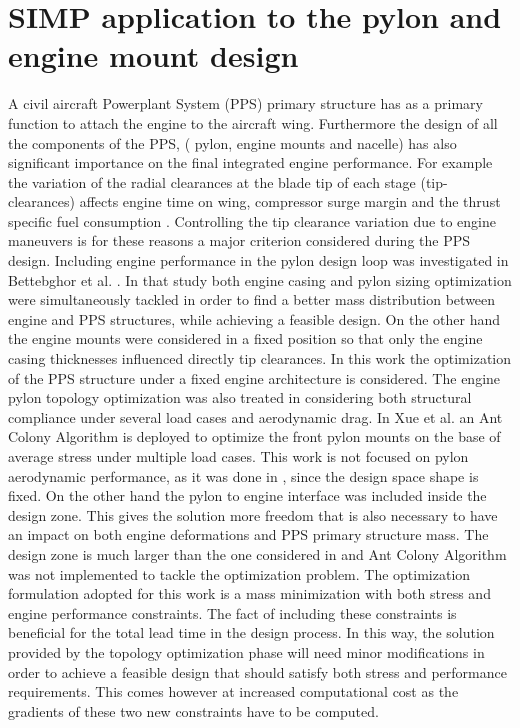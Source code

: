 \section{SIMP application to the pylon and engine mount design}
\label{SIMP_application}
A civil aircraft Powerplant System (PPS) primary structure has as a primary function to attach the engine to the aircraft wing. Furthermore the design of all the components of the PPS, ( pylon, engine mounts and nacelle) has also significant importance on the final integrated engine performance.
For example the variation of the radial clearances at the blade tip of each stage (tip-clearances) affects engine time on wing, compressor surge margin and the thrust specific fuel consumption \cite{lattime2002turbine,benito20083d}. Controlling the tip clearance variation due to engine maneuvers is for these reasons a major criterion considered during the PPS design. Including engine performance in the pylon design loop was investigated in Bettebghor et al. \cite{bettebghor2013bi}. In that study both engine casing and pylon sizing optimization were simultaneously tackled in order to find a better mass distribution between engine and PPS structures, while achieving a feasible design. On the other hand the engine mounts were considered in a fixed position so that only the engine casing thicknesses influenced directly tip clearances.
In this work the optimization of the PPS structure under a fixed engine architecture is considered.
 The engine pylon topology optimization was also treated in \cite{remouchamps2011application} considering both structural compliance under several load cases and aerodynamic drag.
 In Xue et al. \cite{xue2012structural} an Ant Colony Algorithm is deployed to optimize the front pylon mounts on the base of average stress under multiple load cases.
 This work is not focused on pylon aerodynamic performance, as it was done in \cite{remouchamps2011application}, since the design space shape is fixed. On the other hand the pylon to engine interface was included inside the design zone. This gives the solution more freedom that is also necessary to have an impact on both engine deformations and PPS primary structure mass. The design zone is much larger than the one considered in \cite{xue2012structural} and Ant Colony Algorithm was not implemented to tackle the optimization problem.
 The optimization formulation adopted for this work is a mass minimization with both stress and engine performance constraints. The fact of including these constraints is beneficial for the total lead time in the design process. In this way, the solution provided by the topology optimization phase will need minor modifications in order to achieve a feasible design that should satisfy both stress and performance requirements. This comes however at increased computational cost as the gradients of these two new constraints have to be computed.\\
